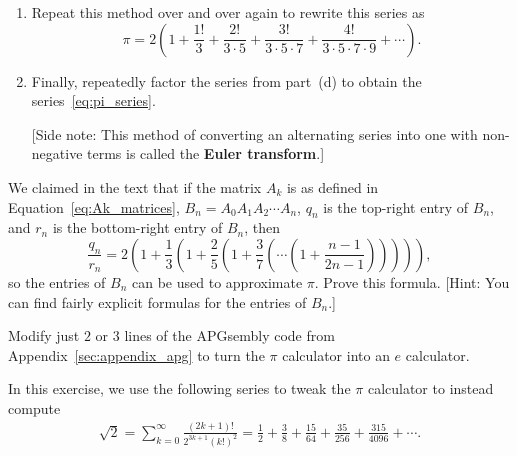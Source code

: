 \begin{multicols}{2}
\begin{problemstar}
\begin{enumerate}[label=\bf\color{ocre}(\alph*)]
			\item Repeat this method over and over again to rewrite this series as
			\[
			\pi = 2\left(1 + \frac{1!}{3} + \frac{2!}{3\cdot 5} + \frac{3!}{3\cdot 5 \cdot 7} + \frac{4!}{3 \cdot 5 \cdot 7 \cdot 9} + \cdots\right).
			\]
			
			\item Finally, repeatedly factor the series from part~(d) to obtain the series~\eqref{eq:pi_series}.
			
			[Side note: This method of converting an alternating series into one with non-negative terms is called the \textbf{Euler transform}.]
		\end{enumerate}
	\end{problemstar}


	\mfilbreak
	
	
	\begin{problemstar}\label{exer:pi_calc_prove_correct} 
		We claimed in the text that if the matrix $A_k$ is as defined in Equation~\eqref{eq:Ak_matrices}, $B_n = A_0A_1A_2\cdots A_n$, $q_n$ is the top-right entry of $B_n$, and $r_n$ is the bottom-right entry of $B_n$, then
		\[
			\frac{q_n}{r_n} = 2\left(1 + \frac{1}{3}\left( 1 + \frac{2}{5}\left( 1 + \frac{3}{7}\left( \cdots \left( 1 + \frac{n-1}{2n-1}\right)\right)\right)\right)\right),
		\]
		so the entries of $B_n$ can be used to approximate $\pi$. Prove this formula. [Hint: You can find fairly explicit formulas for the entries of $B_n$.]
	\end{problemstar}
	
	
	\mfilbreak
	
	
	\begin{problemstar}\label{exer:universal_computation_e_calc} 
		Modify just $2$ or $3$ lines of the APGsembly code from Appendix~\ref{sec:appendix_apg} to turn the $\pi$ calculator into an $e$ calculator.
		
	\end{problemstar}
	
	
	\mfilbreak
	
	
	\begin{problem}\label{exer:universal_computation_sqrt2_calc}
		In this exercise, we use the following series to tweak the $\pi$ calculator to instead compute
		\begin{align*}
			\sqrt{2} = \sum_{k=0}^\infty \frac{(2k+1)!}{2^{3k+1}(k!)^2 } = \frac{1}{2} +\frac{3}{8} + \frac{15}{64} + \frac{35}{256} + \frac{315}{4096} + \cdots.
		\end{align*}
		

\end{problem}
\end{multicols}
